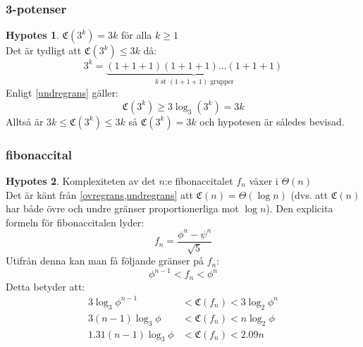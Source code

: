 \documentclass[a4paper,titlepage,swedish]{article}
\newcommand{\C}[1]{\mathfrak C \left( #1 \right)}
\theoremstyle{definition}
\newtheorem*{hypot}{Hypotes}
\begin{document}
        \subsubsection{3-potenser}
        \begin{hypot}
            $\C{3^k}=3k$ \quad för alla $k\ge1$ \\
            Det är tydligt att $\C{3^k} \le 3k$ då:
            $$ 3^k = \underbrace{(1+1+1)(1+1+1)\ldots(1+1+1)}_{k \text{ st } (1+1+1) \text{ grupper}}$$
            Enligt \cref{undregrans} gäller:
            $$ \C{3^k} \ge 3\log_3(3^k) = 3k $$
            Alltså är $3k\le\C{3^k}\le3k$ så $\C{3^k}=3k$ och hypotesen är
            således bevisad.
        \end{hypot}

        \subsubsection{fibonaccital}
        \begin{hypot}
            Komplexiteten av det $n$:e fibonaccitalet $f_n$ växer i $\Theta(n)$ \\
            Det är känt från \cref{ovregrans,undregrans} att $\C{n}=\Theta(\log
            n)$ (dvs. att $\C{n}$ har både övre och undre gränser proportionerliga
            mot $\log n$). Den explicita formeln för fibonaccitalen lyder:
            $$ f_n = \frac{\phi^n-\psi^n}{\sqrt{5}} $$
            Utifrån denna kan man få följande gränser på $f_n$:
            $$ \phi^{n-1} < f_n < \phi^{n} $$
            Detta betyder att:
            \begin{align*}
                3\log_3\phi^{n-1} &< \C{f_n} <3\log_2\phi^{n} \\
                3(n-1)\log_3\phi &< \C{f_n} < n\log_2\phi \\
                1.31(n-1)\log_3\phi &< \C{f_n} < 2.09n
            \end{align*}
        \end{hypot}
\end{document}
